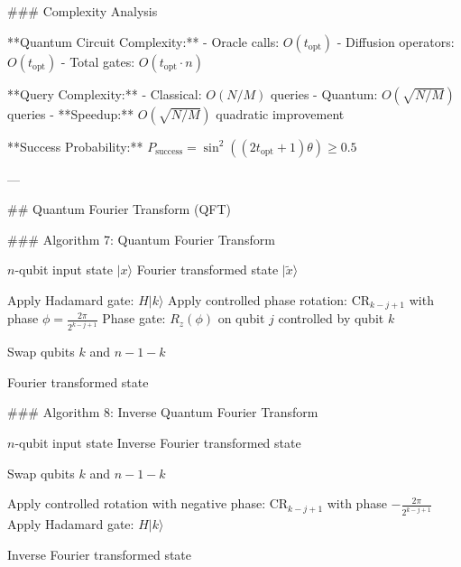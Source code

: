 ### Complexity Analysis

**Quantum Circuit Complexity:**
- Oracle calls: $O(t_{\text{opt}})$
- Diffusion operators: $O(t_{\text{opt}})$
- Total gates: $O(t_{\text{opt}} \cdot n)$

**Query Complexity:**
- Classical: $O(N/M)$ queries
- Quantum: $O(\sqrt{N/M})$ queries
- **Speedup:** $O(\sqrt{N/M})$ quadratic improvement

**Success Probability:**
$P_{\text{success}} = \sin^2((2t_{\text{opt}}+1)\theta) \geq 0.5$

---

## Quantum Fourier Transform (QFT)

### Algorithm 7: Quantum Fourier Transform

\begin{algorithm}
\caption{Quantum Fourier Transform (QFT)}
\begin{algorithmic}[1]
\REQUIRE $n$-qubit input state $|x\rangle$
\ENSURE Fourier transformed state $|\tilde{x}\rangle$

    \STATE Apply Hadamard gate: $H|k\rangle$
        \STATE Apply controlled phase rotation:
        \STATE \quad CR$_{k-j+1}$ with phase $\phi = \frac{2\pi}{2^{k-j+1}}$
        \STATE \quad Phase gate: $R_z(\phi)$ on qubit $j$ controlled by qubit $k$
    \ENDFOR
\ENDFOR

    \STATE Swap qubits $k$ and $n-1-k$
\ENDFOR

\RETURN Fourier transformed state
\end{algorithmic}
\end{algorithm}

### Algorithm 8: Inverse Quantum Fourier Transform

\begin{algorithm}
\caption{Inverse Quantum Fourier Transform (QFT$^\dagger$)}
\begin{algorithmic}[1]
\REQUIRE $n$-qubit input state
\ENSURE Inverse Fourier transformed state

    \STATE Swap qubits $k$ and $n-1-k$
\ENDFOR

        \STATE Apply controlled rotation with negative phase:
        \STATE \quad CR$_{k-j+1}$ with phase $-\frac{2\pi}{2^{k-j+1}}$
    \ENDFOR
    \STATE Apply Hadamard gate: $H|k\rangle$
\ENDFOR

\RETURN Inverse Fourier transformed state
\end{algorithmic}
\end{algorithm}

